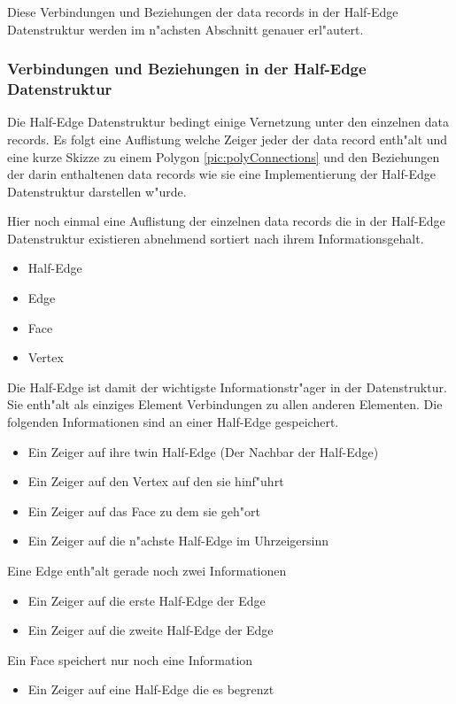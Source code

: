 \documentclass[pagesize, paper=a4, fontsize=12pt,titlepage=true, headings=small, headnosepline, abstractoff, liststotoc, nochapterprefix, plainheadsepline]{scrreprt}
\newcommand{\HES}{Half-Edge Datenstruktur }
\begin{document}
Diese Verbindungen und Beziehungen der data records in der \HES werden im n"achsten Abschnitt genauer erl"autert.

			\subsubsection {Verbindungen und Beziehungen in der \HES}
				Die \HES bedingt einige Vernetzung unter den einzelnen data records. Es folgt eine Auflistung welche Zeiger jeder der data record enth"alt und eine kurze Skizze zu einem Polygon \ref{pic:polyConnections} und den Beziehungen der darin enthaltenen data records wie sie eine Implementierung der \HES darstellen w"urde.

Hier noch einmal eine Auflistung der einzelnen data records die in der \HES existieren abnehmend sortiert nach ihrem Informationsgehalt.
\begin{itemize}
\item Half-Edge
\item Edge
\item Face
\item Vertex
\end{itemize}

Die Half-Edge ist damit der wichtigste Informationstr"ager in der Datenstruktur. Sie enth"alt als einziges Element Verbindungen zu allen anderen Elementen.
Die folgenden Informationen sind an einer Half-Edge gespeichert.
\begin{itemize}
\item Ein Zeiger auf ihre twin Half-Edge (Der Nachbar der Half-Edge)
\item Ein Zeiger auf den Vertex auf den sie hinf"uhrt
\item Ein Zeiger auf das Face zu dem sie geh"ort
\item Ein Zeiger auf die n"achste Half-Edge im Uhrzeigersinn
\end{itemize}

Eine Edge enth"alt gerade noch zwei Informationen
\begin{itemize}
\item Ein Zeiger auf die erste Half-Edge der Edge
\item Ein Zeiger auf die zweite Half-Edge der Edge
\end{itemize}

Ein Face speichert nur noch eine Information
\begin{itemize}
\item Ein Zeiger auf eine Half-Edge die es begrenzt
\end{itemize}
\end{document}
